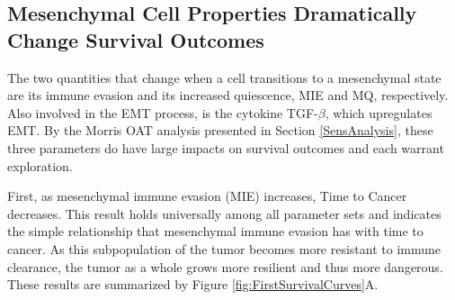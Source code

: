 \documentclass{article}
\begin{document}
\subsection{Mesenchymal Cell Properties Dramatically Change Survival Outcomes}\label{MesPars}
The two quantities that change when a cell transitions to a mesenchymal state are its immune evasion and its increased quiescence, MIE and MQ, respectively.
Also involved in the EMT process, is the cytokine TGF-$\beta$, which upregulates EMT.
By the Morris OAT analysis presented in Section \ref{SensAnalysis}, these three parameters do have large impacts on survival outcomes and each warrant exploration.

First, as mesenchymal immune evasion (MIE) increases, Time to Cancer decreases.
This result holds universally among all parameter sets and indicates the simple relationship that mesenchymal immune evasion has with time to cancer.
As this subpopulation of the tumor becomes more resistant to immune clearance, the tumor as a whole grows more resilient and thus more dangerous.
These results are summarized by Figure \ref{fig:FirstSurvivalCurves}A.
\end{document}
